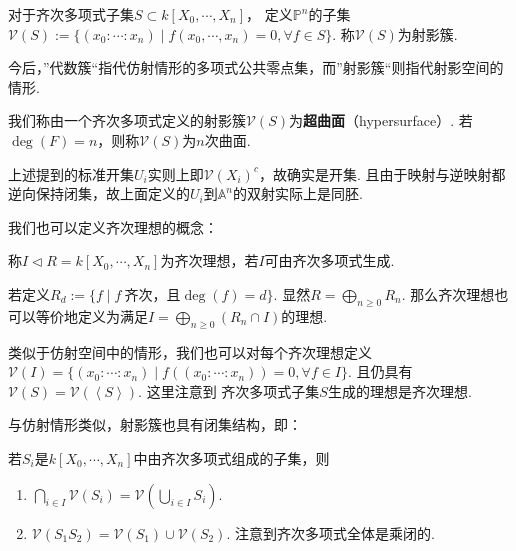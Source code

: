     \begin{definition}
        对于齐次多项式子集$S \subset k[X_{0},\cdots,X_{n}]$，
        定义$\mathbb{P}^{n}$的子集
        $\mathcal{V}(S):=\{(x_{0}:\cdots:x_{n})\mid f(x_{0},\cdots,x_{n})=0, \forall f \in S\}$.
        称$\mathcal{V}(S)$为射影簇.
    \end{definition}    

    今后，”代数簇“指代仿射情形的多项式公共零点集，而”射影簇“则指代射影空间的情形.

    我们称由一个齐次多项式定义的射影簇$\mathcal{V}(S)$为\textbf{超曲面}（hypersurface）. 
    若$\deg(F)=n$，则称$\mathcal{V}(S)$为$n$次曲面. 

    \begin{remark}
        上述提到的标准开集$U_{i}$实则上即$\mathcal{V}(X_{i})^{c}$，故确实是开集. 
        且由于映射与逆映射都逆向保持闭集，故上面定义的$U_{i}$到$\mathbb{A}^{n}$的双射实际上是同胚.
    \end{remark}

    我们也可以定义齐次理想的概念：

    \begin{definition}
        称$I \lhd R = k[X_{0},\cdots,X_{n}]$为齐次理想，若$I$可由齐次多项式生成. \par
        若定义$R_{d}:=\{f \mid f\ 齐次，且\deg(f)=d\}$. 
        显然$R = \bigoplus_{n \geq 0} R_{n}$. 
        那么齐次理想也可以等价地定义为满足$I = \bigoplus_{n \geq 0}(R_{n} \cap I)$的理想.
    \end{definition}

    类似于仿射空间中的情形，我们也可以对每个齐次理想定义
    $\mathcal{V}(I)=\{(x_{0}:\cdots:x_{n}) \mid f((x_{0}:\cdots:x_{n}))=0,\forall f \in I\}$.
    且仍具有$\mathcal{V}(S)=\mathcal{V}(\left<S\right>)$. 这里注意到
    齐次多项式子集$S$生成的理想是齐次理想.

    与仿射情形类似，射影簇也具有闭集结构，即：
    \begin{proposition} 若$S_{i}$是$k[X_{0},\cdots,X_{n}]$中由齐次多项式组成的子集，则
        \begin{enumerate}
            \item[(1)] $\bigcap_{i \in I}\mathcal{V}(S_{i})=\mathcal{V}(\bigcup_{i \in I}S_{i})$.
            \item[(2)] $\mathcal{V}(S_{1}S_{2})=\mathcal{V}(S_{1}) \cup \mathcal{V}(S_{2})$. 注意到齐次多项式全体是乘闭的.
        \end{enumerate}
    \end{proposition}

